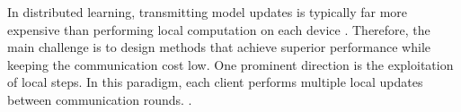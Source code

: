 \documentclass{article}
\begin{document}
In distributed learning, transmitting model updates is typically far more expensive than 
performing local computation on each device 
\citep{konevcny2016federated, kairouz2021advances}. Therefore, the main 
challenge is to design methods that achieve superior performance while 
keeping the communication cost low.  One prominent direction  is the exploitation of local steps. In this paradigm,  each client performs 
multiple local updates between communication rounds. \citep{mcmahan2017communication, khaled2020tighter, 
woodworth2020minibatch, li2020federated}. 







\end{document}
